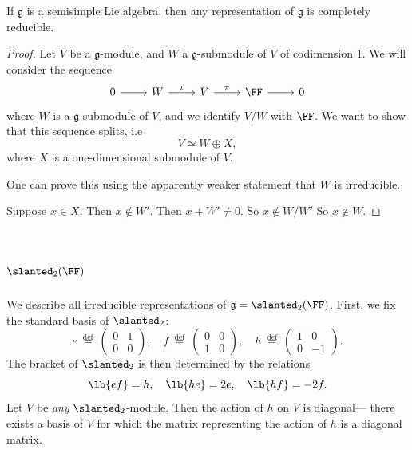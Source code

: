 \documentclass{article}
\newcommand*\defeq{\ \overset{\mathrm{def}}{=}\ }
\DeclarePairedDelimiter\lb\lbrack\rbrack
\newcommand*\frkg{{\ensuremath{\mathfrak{g}}}}
\let\sl\slanted
\newcommand*\sl{\ensuremath{\mathfrak{sl}}}
\begin{document}
\begin{theorem}
    If $\frkg$ is a semisimple Lie algebra, then any representation of $\frkg$ is completely reducible.
\end{theorem}

\begin{proof}
    Let $V$ be a $\frkg$-module, and $W$ a $\frkg$-submodule of $V$ of codimension $1$.
    We will consider the sequence
    \[
        \begin{tikzcd}
            0 \arrow[r] & W \arrow[r, "\iota"] & V \arrow[r, "\pi"] & \FF \arrow[r] & 0
        \end{tikzcd}
    \]
    where $W$ is a $\frkg$-submodule of $V$, and we identify $V/W$ with $\FF$.
    We want to show that this sequence splits, i.e
    \[
        V 
        \simeq 
        W \oplus X,
    \]
    where $X$ is a one-dimensional submodule of $V$.

    One can prove this using the apparently weaker statement that $W$ is irreducible.

    Suppose $x \in X$.
    Then $x \notin W'$.
    Then $x + W' \neq 0$.
    So $x \notin W/W'$
    So $x \notin W$.
\end{proof}

\section{
\texorpdfstring{$\sl_2(\FF)$}{sl2(F)}
}

We describe all irreducible representations of $\frkg = \sl_2(\FF)$.
First, we fix the standard basis of $\sl_2$:
\[
    e 
    \defeq
    \begin{pmatrix}
        0 & 1 \\
        0 & 0 
    \end{pmatrix}, \quad
    f 
    \defeq
    \begin{pmatrix}
        0 & 0 \\
        1 & 0 
    \end{pmatrix}, \quad
    h 
    \defeq
    \begin{pmatrix}
        1 & 0 \\
        0 & -1 
    \end{pmatrix}.
\]
The bracket of $\sl_2$ is then determined by the relations
\[
    \lb{ef} = h, \quad
    \lb{he} = 2e, \quad
    \lb{hf} = -2f.
\]
Let $V$ be \textit{any} $\sl_2$-module.
Then the action of $h$ on $V$ is diagonal--- there exists a basis of $V$ for which the matrix representing the action of $h$ is a diagonal matrix.
\end{document}
